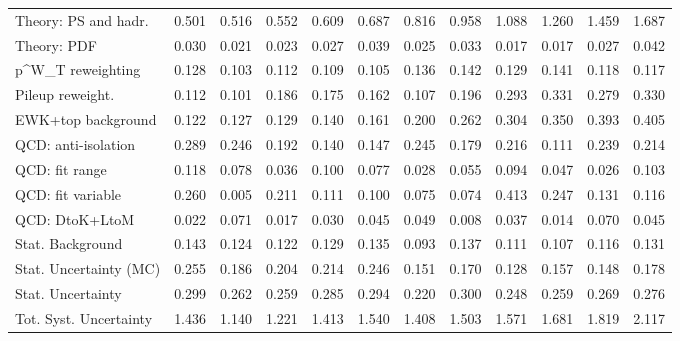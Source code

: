 \begin{tabular}{l|p{0.6cm}p{0.6cm}p{0.6cm}p{0.6cm}p{0.6cm}p{0.6cm}p{0.6cm}p{0.6cm}p{0.6cm}p{0.6cm}p{0.6cm}}
Theory: PS and hadr.                     & 0.501 & 0.516 & 0.552 & 0.609 & 0.687 & 0.816 & 0.958 & 1.088 & 1.260 & 1.459 & 1.687 \\
Theory: PDF                              & 0.030 & 0.021 & 0.023 & 0.027 & 0.039 & 0.025 & 0.033 & 0.017 & 0.017 & 0.027 & 0.042 \\
p^{W}_{T} reweighting                    & 0.128 & 0.103 & 0.112 & 0.109 & 0.105 & 0.136 & 0.142 & 0.129 & 0.141 & 0.118 & 0.117 \\
Pileup reweight.                         & 0.112 & 0.101 & 0.186 & 0.175 & 0.162 & 0.107 & 0.196 & 0.293 & 0.331 & 0.279 & 0.330 \\
EWK+top background                       & 0.122 & 0.127 & 0.129 & 0.140 & 0.161 & 0.200 & 0.262 & 0.304 & 0.350 & 0.393 & 0.405 \\
QCD: anti-isolation                      & 0.289 & 0.246 & 0.192 & 0.140 & 0.147 & 0.245 & 0.179 & 0.216 & 0.111 & 0.239 & 0.214 \\
QCD: fit range                           & 0.118 & 0.078 & 0.036 & 0.100 & 0.077 & 0.028 & 0.055 & 0.094 & 0.047 & 0.026 & 0.103 \\
QCD: fit variable                        & 0.260 & 0.005 & 0.211 & 0.111 & 0.100 & 0.075 & 0.074 & 0.413 & 0.247 & 0.131 & 0.116 \\
QCD: DtoK+LtoM                           & 0.022 & 0.071 & 0.017 & 0.030 & 0.045 & 0.049 & 0.008 & 0.037 & 0.014 & 0.070 & 0.045 \\
Stat. Background                         & 0.143 & 0.124 & 0.122 & 0.129 & 0.135 & 0.093 & 0.137 & 0.111 & 0.107 & 0.116 & 0.131 \\
Stat. Uncertainty (MC)                   & 0.255 & 0.186 & 0.204 & 0.214 & 0.246 & 0.151 & 0.170 & 0.128 & 0.157 & 0.148 & 0.178 \\
\hline
Stat. Uncertainty                        & 0.299 & 0.262 & 0.259 & 0.285 & 0.294 & 0.220 & 0.300 & 0.248 & 0.259 & 0.269 & 0.276 \\
\hline
Tot. Syst. Uncertainty                   & 1.436 & 1.140 & 1.221 & 1.413 & 1.540 & 1.408 & 1.503 & 1.571 & 1.681 & 1.819 & 2.117 \\
\hline
\end{tabular}
